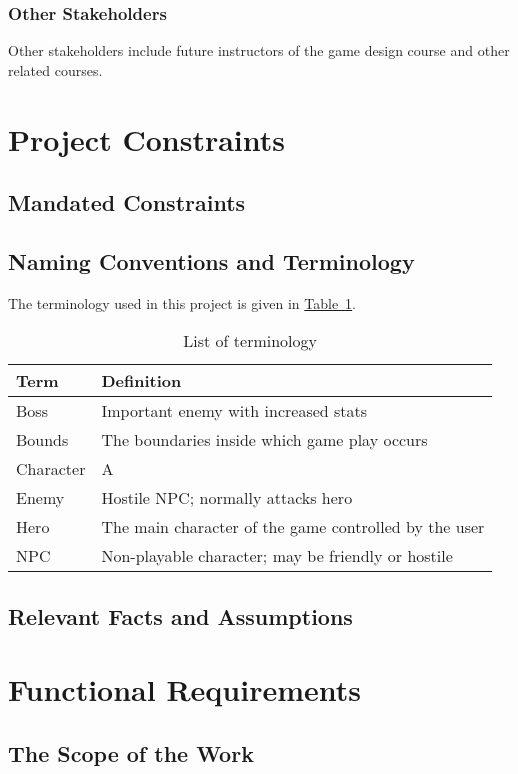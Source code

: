 \documentclass[12pt, titlepage]{article}
\begin{document}
\subsubsection{Other Stakeholders}
Other stakeholders include future instructors of the game design course and other related courses.
\section{Project Constraints}
\subsection{Mandated Constraints}

\subsection{Naming Conventions and Terminology}
The terminology used in this project is given in \hyperref[tab:terminology]{Table~\ref*{tab:terminology}}.
\begin{table}
\caption{List of terminology} \label{tab:terminology}
\begin{tabularx}{\textwidth}{p{3cm}X}
\toprule {\bf Term} & {\bf Definition}\\
\midrule
Boss & Important enemy with increased stats\\
Bounds & The boundaries inside which game play occurs\\
Character & A\\
Enemy & Hostile NPC; normally attacks hero\\
Hero & The main character of the game controlled by the user\\
NPC & Non-playable character; may be friendly or hostile\\
\bottomrule
\end{tabularx}
\end{table}

\subsection{Relevant Facts and Assumptions}

\section{Functional Requirements}
\subsection{The Scope of the Work}
\end{document}
